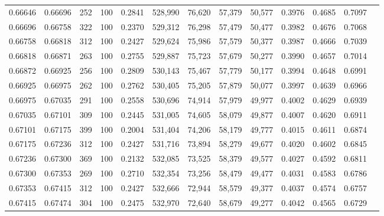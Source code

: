 \begin{tabular}{rrrrrrrrrrrrr}
0.66646 & 0.66696 &   252 & 100 &                                     0.2841 & 528,990 &  76,620 &  57,379 &  50,577 & 0.3976 & 0.4685 & 0.7097 \\
0.66696 & 0.66758 &   322 & 100 &                                     0.2370 & 529,312 &  76,298 &  57,479 &  50,477 & 0.3982 & 0.4676 & 0.7068 \\
0.66758 & 0.66818 &   312 & 100 &                                     0.2427 & 529,624 &  75,986 &  57,579 &  50,377 & 0.3987 & 0.4666 & 0.7039 \\
0.66818 & 0.66871 &   263 & 100 &                                     0.2755 & 529,887 &  75,723 &  57,679 &  50,277 & 0.3990 & 0.4657 & 0.7014 \\
0.66872 & 0.66925 &   256 & 100 &                                     0.2809 & 530,143 &  75,467 &  57,779 &  50,177 & 0.3994 & 0.4648 & 0.6991 \\
0.66925 & 0.66975 &   262 & 100 &                                     0.2762 & 530,405 &  75,205 &  57,879 &  50,077 & 0.3997 & 0.4639 & 0.6966 \\
0.66975 & 0.67035 &   291 & 100 &                                     0.2558 & 530,696 &  74,914 &  57,979 &  49,977 & 0.4002 & 0.4629 & 0.6939 \\
0.67035 & 0.67101 &   309 & 100 &                                     0.2445 & 531,005 &  74,605 &  58,079 &  49,877 & 0.4007 & 0.4620 & 0.6911 \\
0.67101 & 0.67175 &   399 & 100 &                                     0.2004 & 531,404 &  74,206 &  58,179 &  49,777 & 0.4015 & 0.4611 & 0.6874 \\
0.67175 & 0.67236 &   312 & 100 &                                     0.2427 & 531,716 &  73,894 &  58,279 &  49,677 & 0.4020 & 0.4602 & 0.6845 \\
0.67236 & 0.67300 &   369 & 100 &                                     0.2132 & 532,085 &  73,525 &  58,379 &  49,577 & 0.4027 & 0.4592 & 0.6811 \\
0.67300 & 0.67353 &   269 & 100 &                                     0.2710 & 532,354 &  73,256 &  58,479 &  49,477 & 0.4031 & 0.4583 & 0.6786 \\
0.67353 & 0.67415 &   312 & 100 &                                     0.2427 & 532,666 &  72,944 &  58,579 &  49,377 & 0.4037 & 0.4574 & 0.6757 \\
0.67415 & 0.67474 &   304 & 100 &                                     0.2475 & 532,970 &  72,640 &  58,679 &  49,277 & 0.4042 & 0.4565 & 0.6729 \\

\end{tabular}
